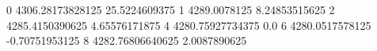 0 4306.28173828125 25.5224609375
1 4289.0078125 8.24853515625
2 4285.4150390625 4.65576171875
4 4280.75927734375 0.0
6 4280.0517578125 -0.70751953125
8 4282.76806640625 2.0087890625
